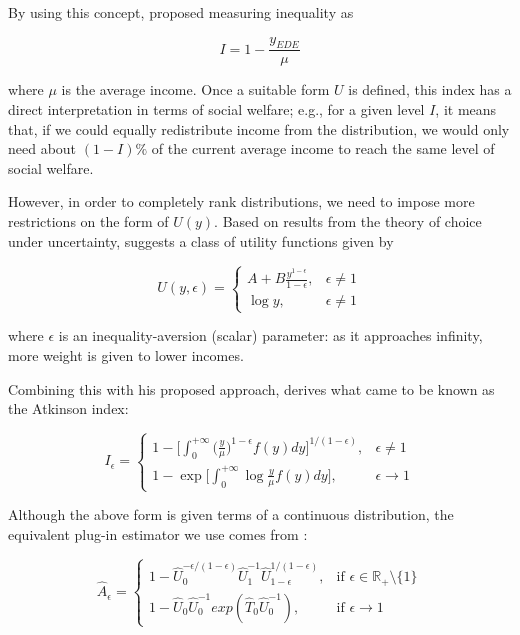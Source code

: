 \documentclass[
]{book}
\begin{document}
By using this concept, \textcite{atkinson1970} proposed measuring inequality as

\[
I = 1 - \frac{ y_{EDE}}{ \mu }
\]

\noindent where \(\mu\) is the average income.
Once a suitable form \(U\) is defined, this index has a direct interpretation in terms of social welfare;
e.g., for a given level \(I\), it means that, if we could equally redistribute income from the distribution, we would only need
about \((1 - I)\%\) of the current average income to reach the same level of social welfare.

However, in order to completely rank distributions, we need to impose more restrictions
on the form of \(U(y)\).
Based on results from the theory of choice under uncertainty, \textcite{atkinson1970}
suggests a class of utility functions given by

\[
U( y , \epsilon ) =
\begin{cases}
A + B \frac{y^{1 - \epsilon}}{1 - \epsilon} , &\epsilon \neq 1 \\
\log y , &\epsilon \neq 1
\end{cases}
\]

\noindent where \(\epsilon\) is an inequality-aversion (scalar) parameter: as it
approaches infinity, more weight is given to lower incomes.

Combining this with his proposed approach, \textcite{atkinson1970} derives what came to be known as
the Atkinson index:

\[
I_\epsilon = 
\begin{cases}
1 - \bigg[ \int_0^{+ \infty} \big( {\frac{y}{\mu} } \big)^{1-\epsilon} f(y) dy \bigg]^{1/(1-\epsilon)} , &\epsilon \neq 1 \\
1 - \exp \bigg[ \int_0^{+ \infty} \log \frac{y}{\mu} f(y) dy \bigg] , &\epsilon \to 1
\end{cases}
\]

Although the above form is given terms of a continuous distribution,
the equivalent plug-in estimator we use comes from \textcite{biewen2003}:

\[
\widehat{A}_\epsilon =
\begin{cases}
 1 - \widehat{U}_0^{ - \epsilon/(1 - \epsilon) } \widehat{U}_1^{ -1 } \widehat{U}_{1 - \epsilon}^{ 1/(1 - \epsilon) } , &\text{if } \epsilon \in \mathbb{R}_+ \setminus\{ 1 \} \\
1 - \widehat{U}_0 \widehat{U}_0^{-1} exp( \widehat{T}_0 \widehat{U}_0^{-1} ), &\text{if } \epsilon \rightarrow1
\end{cases}
\]
\end{document}
